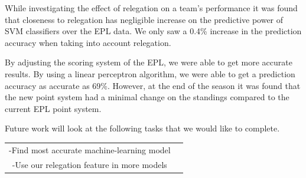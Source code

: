 \documentclass[conference]{IEEEtran}
\begin{document}
While investigating the effect of relegation on a team's performance it was found that closeness to relegation has negligible increase on the predictive power of SVM classifiers over the EPL data. We only saw a 0.4\% increase in the prediction accuracy when taking into account relegation.

By adjusting the scoring system of the EPL, we were able to get more accurate results. By using a linear perceptron algorithm, we were able to get a prediction accuracy as accurate as 69\%. However, at the end of the season it was found that the new point system had a minimal change on the standings compared to the current EPL point system.

Future work will look at the following tasks that we would like to complete.\begin{center}
 \begin{tabular}{@{} cc @{}} 
   \hline
       -Find most accurate machine-learning model\\ 
       -Use our relegation feature in more models\\  
   \hline
 \end{tabular}
\end{center}
\hfill

\end{document}
